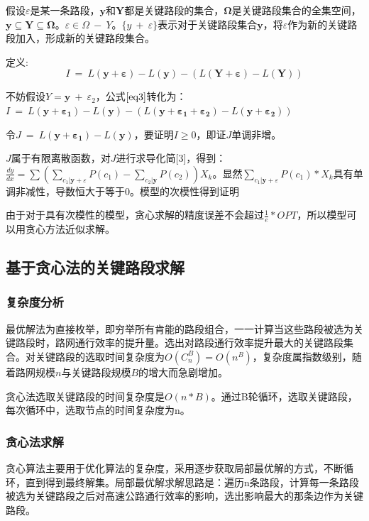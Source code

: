 				假设$\varepsilon$是某一条路段，$\bm{y}$和$\bm{Y}$都是关键路段的集合，$\bm{\Omega}$是关键路段集合的全集空间，$\bm{y} \subseteq \bm{Y} \subseteq \bm{\Omega}$。$\varepsilon \in \Omega \ - \ Y$。$\{y \ + \ \varepsilon\}$表示对于关键路段集合$\bm{y}$，将$\varepsilon$作为新的关键路段加入，形成新的关键路段集合。

				定义:
				\begin{equation}
				I\ =\ L(\bm{y+\varepsilon})-L(\bm{y})-(L(\bm{Y+ \varepsilon}) - L(\bm{Y}))
				\label{eq3}
				\end{equation}

				不妨假设$Y = \bm{y}\ +\ \varepsilon_2$，公式$\ref{eq3}$转化为：$I\ =\ L(\bm{y+\varepsilon_1})-L(\bm{y})-(L(\bm{y+ \varepsilon_1+\varepsilon_2}) - L(\bm{y+\varepsilon_2}))$

				令$J\ =\ L(\bm{y+\varepsilon_1})-L(\bm{y})$，要证明$I \ge 0$，即证$J$单调非增。

				$J$属于有限离散函数，对$J$进行求导化简[3]，得到：$\frac{{dy}}{{dx}} = \sum {(\sum\limits_{{c_1}|\bm{y} + \varepsilon } {P({c_1})}  - \sum\limits_{{c_2}|\bm{y}} {P({c_2})} )} {X_k}$。显然${\sum\limits_{{c_1}|\bm{y} + \varepsilon } {P({c_1})} * X_k}$具有单调非减性，导数恒大于等于0。模型的次模性得到证明

				由于对于具有次模性的模型，贪心求解的精度误差不会超过$\frac{1}{e} * OPT$，所以模型可以用贪心方法近似求解。
			
		\subsection{基于贪心法的关键路段求解}
			\subsubsection{复杂度分析}
			最优解法为直接枚举，即穷举所有肯能的路段组合，一一计算当这些路段被选为关键路段时，路网通行效率的提升量。选出对路段通行效率提升最大的关键路段集合。对关键路段的选取时间复杂度为$O(C_n^B)=O(n^B)$，复杂度属指数级别，随着路网规模$n$与关键路段规模$B$的增大而急剧增加。

			贪心法选取关键路段的时间复杂度是$O(n*B)$。通过B轮循环，选取关键路段，每次循环中，选取节点的时间复杂度为n。
			\subsubsection{贪心法求解}
			贪心算法主要用于优化算法的复杂度，采用逐步获取局部最优解的方式，不断循环，直到得到最终解集。局部最优解求解思路是：遍历n条路段，计算每一条路段被选为关键路段之后对高速公路通行效率的影响，选出影响最大的那条边作为关键路段。

